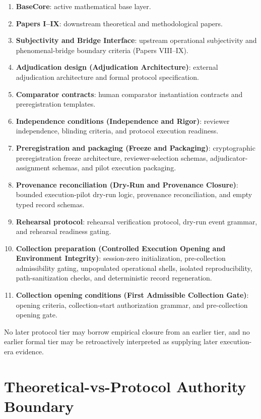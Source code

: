 \documentclass[11pt,a4paper]{article}
\begin{document}
\begin{enumerate}
\item \textbf{BaseCore}: active mathematical base layer.
\item \textbf{Papers I--IX}: downstream theoretical and methodological papers.
\item \textbf{Subjectivity and Bridge Interface}: upstream operational subjectivity and phenomenal-bridge boundary criteria (Papers VIII--IX).
\item \textbf{Adjudication design (Adjudication Architecture)}: external adjudication architecture and formal protocol specification.
\item \textbf{Comparator contracts}: human comparator instantiation contracts and preregistration templates.
\item \textbf{Independence conditions (Independence and Rigor)}: reviewer independence, blinding criteria, and protocol execution readiness.
\item \textbf{Preregistration and packaging (Freeze and Packaging)}: cryptographic preregistration freeze architecture, reviewer-selection schemas, adjudicator-assignment schemas, and pilot execution packaging.
\item \textbf{Provenance reconciliation (Dry-Run and Provenance Closure)}: bounded execution-pilot dry-run logic, provenance reconciliation, and empty typed record schemas.
\item \textbf{Rehearsal protocol}: rehearsal verification protocol, dry-run event grammar, and rehearsal readiness gating.
\item \textbf{Collection preparation (Controlled Execution Opening and Environment Integrity)}: session-zero initialization, pre-collection admissibility gating, unpopulated operational shells, isolated reproducibility, path-sanitization checks, and deterministic record regeneration.
\item \textbf{Collection opening conditions (First Admissible Collection Gate)}: opening criteria, collection-start authorization grammar, and pre-collection opening gate.
\end{enumerate}

No later protocol tier may borrow empirical closure from an earlier tier, and no earlier formal tier may be retroactively interpreted as supplying later execution-era evidence.

\section{Theoretical-vs-Protocol Authority Boundary}
\end{document}
